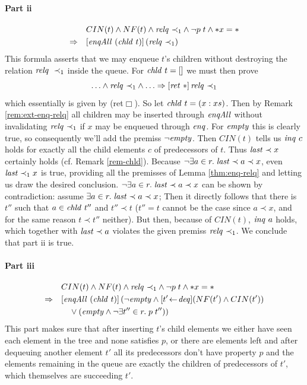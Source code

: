 \paragraph{Part ii}
\begin{align*}
  & CIN(t) \land NF(t) \land \mathit{relq}~{\prec}_1 \land \lnot p\;t \land {\ast x} = 
  \ast \\
  \Rightarrow\quad& [\mathit{enqAll}~(\mathit{chld}~t)]\,(\mathit{relq}~{\prec}_1)
\end{align*}
This formula asserts that we may enqueue $t$'s children without destroying the
relation $\mathit{relq}~\prec_1$ inside the queue. For $\mathit{chld}\ t = []$ we must then prove
\[ \ldots \land \mathit{relq}~{\prec}_1 \land \ldots \Rightarrow [\mathit{ret}~\ast]\,{\mathit{relq}~{\prec}_1}\]
 which essentially is given by
(ret$\Box$). So let $\mathit{chld}\ t = (x:xs)$.  Then by Remark \ref{rem:ext-enq-relq} all
children may be inserted through $\mathit{enqAll}$ without invalidating $\mathit{relq}~{\prec}_1$ if
$x$ may be enqueued through $\mathit{enq}$. For $\mathit{empty}$ this is clearly true, so
consequently we'll add the premiss $\lnot \mathit{empty}$. Then $CIN(t)$ tells us $\mathit{inq}~c$
holds for exactly all the child elements $c$ of predecessors of $t$. Thus $\mathit{last}
\prec x$ certainly holds (cf. Remark \ref{rem-chld}). Because $\lnot \exists a\in r.\; \mathit{last} \prec
a \prec x$, even $\mathit{last} \prec_1 x$ is true, providing all the premisses of Lemma
\ref{thm:enq-relq} and letting us draw the desired conclusion. $\lnot \exists a\in r.\;
\mathit{last} \prec a \prec x$ can be shown by contradiction: assume $\exists a\in r.\; \mathit{last} \prec a \prec x$;
Then it directly follows that there is $t''$ such that $a \in \mathit{chld}~t''$ and $t''
\prec t$ ($t'' = t$ cannot be the case since $a \prec x$, and for the same reason $t \prec
t''$ neither). But then, because of $CIN(t)$, $\mathit{inq}~a$ holds, which together
with $\mathit{last} \prec a$ violates the given premiss $\mathit{relq}~{\prec}_1$. We conclude that
part ii is true.

\paragraph{Part iii}
\begin{align*}
  & CIN(t) \land NF(t) \land \mathit{relq}~{\prec}_1 \land \lnot p\;t \land {\ast x} =  \ast\\
 \Rightarrow\quad & [\mathit{enqAll}~(\mathit{chld}~t)]\,(\lnot \mathit{empty} \land [t' \!\gets\! \mathit{deq}](NF(t') \land CIN(t')) \\
 & \quad  {}\lor (\mathit{empty} \land \lnot \exists t''\in r.\; p\;t''))
\end{align*}
This part makes sure that after inserting $t$'s child elements we either have seen
each element in the tree and none satisfies $p$, or there are elements left and
after dequeuing another element $t'$ all its predecessors don't have property
$p$ and the elements remaining in the queue are exactly the children of
predecessors of $t'$, which themselves are succeeding $t'$.

